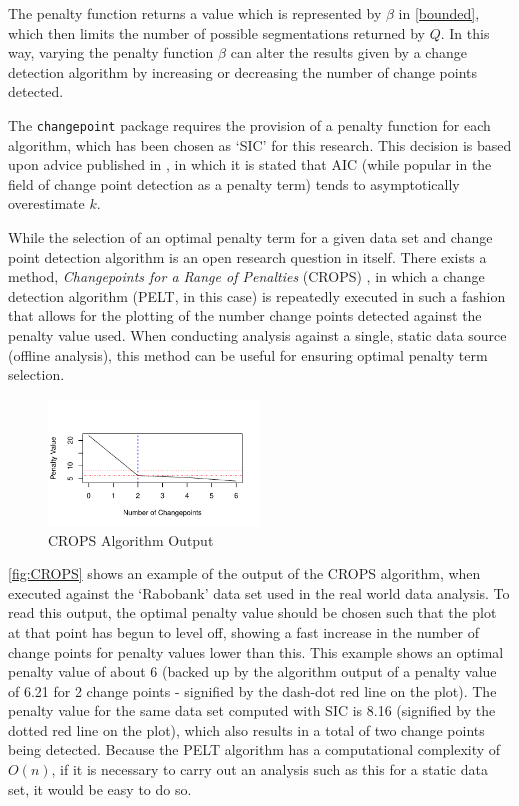 \documentclass{uvamscse}	%
\begin{document}
The penalty function returns a value which is represented by $\beta$ in \autoref{bounded}, which then limits the number of possible segmentations returned by $Q$. In this way, varying the penalty function $\beta$ can alter the results given by a change detection algorithm by increasing or decreasing the number of change points detected.

The \texttt{changepoint} package requires the provision of a penalty function for each algorithm, which has been chosen as `SIC' for this research. This decision is based upon advice published in \cite{Eckley2011}, in which it is stated that AIC (while popular in the field of change point detection as a penalty term) tends to asymptotically overestimate $k$.

While the selection of an optimal penalty term for a given data set and change point detection algorithm is an open research question in itself. There exists a method, \emph{Changepoints for a Range of Penalties} (CROPS) \cite{Haynes2014}, in which a change detection algorithm (PELT, in this case) is repeatedly executed in such a fashion that allows for the plotting of the number change points detected against the penalty value used. When conducting analysis against a single, static data source (offline analysis), this method can be useful for ensuring optimal penalty term selection.

\begin{figure}[h]
\centering
    \includegraphics[width=0.5\textwidth]{figures/CROPS2}
    \caption{CROPS Algorithm Output}
    \label{fig:CROPS}
\end{figure}

\autoref{fig:CROPS} shows an example of the output of the CROPS algorithm, when executed against the `Rabobank' data set used in the real world data analysis. To read this output, the optimal penalty value should be chosen such that the plot at that point has begun to level off, showing a fast increase in the number of change points for penalty values lower than this. This example shows an optimal penalty value of about 6 (backed up by the algorithm output of a penalty value of 6.21 for 2 change points - signified by the dash-dot red line on the plot). The penalty value for the same data set computed with SIC is 8.16 (signified by the dotted red line on the plot), which also results in a total of two change points being detected. Because the PELT algorithm has a computational complexity of $O(n)$, if it is necessary to carry out an analysis such as this for a static data set, it would be easy to do so.
\end{document}
